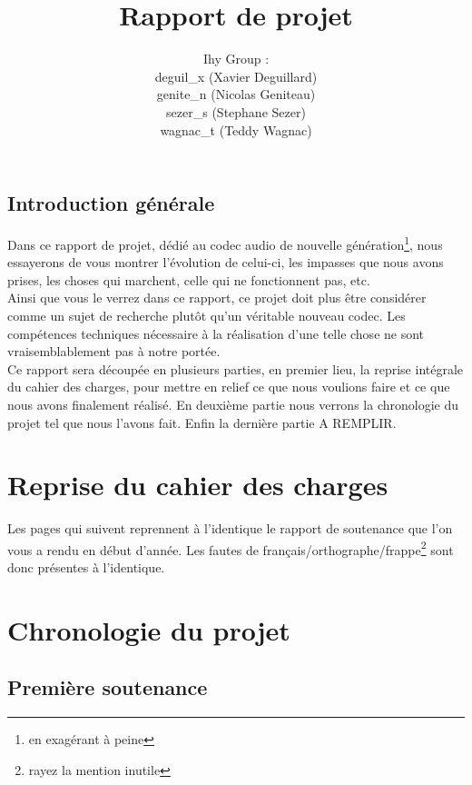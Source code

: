 \documentclass[a4paper,12pt]{report}
\title{Rapport de projet}
\author{
Ihy Group : \\
deguil\_x (Xavier Deguillard)\\
genite\_n (Nicolas Geniteau)\\
sezer\_s (Stephane Sezer)\\
wagnac\_t (Teddy Wagnac)
}
\begin{document}
\maketitle

\section*{Introduction générale}
Dans ce rapport de projet, dédié au codec audio de nouvelle
génération\footnote{en exagérant à peine}, nous essayerons de vous montrer
l'évolution de celui-ci, les impasses que nous avons prises, les choses qui
marchent, celle qui ne fonctionnent pas, etc.\\
Ainsi que vous le verrez dans ce rapport, ce projet doit plus être considérer
comme un sujet de recherche plutôt qu'un véritable nouveau codec. Les
compétences techniques nécessaire à la réalisation d'une telle chose ne sont
vraisemblablement pas à notre portée.\\
Ce rapport sera découpée en plusieurs parties, en premier lieu, la reprise
intégrale du cahier des charges, pour mettre en relief ce que nous voulions
faire et ce que nous avons finalement réalisé. En deuxième partie nous verrons
la chronologie du projet tel que nous l'avons fait. Enfin la dernière partie
A REMPLIR.\\

\tableofcontents

\chapter{Reprise du cahier des charges}
Les pages qui suivent reprennent à l'identique le rapport de soutenance que l'on
vous a rendu en début d'année. Les fautes de
français/orthographe/frappe\footnote{rayez la mention inutile} sont
donc présentes à l'identique.


\chapter{Chronologie du projet}
\section{Première soutenance}
\end{document}
